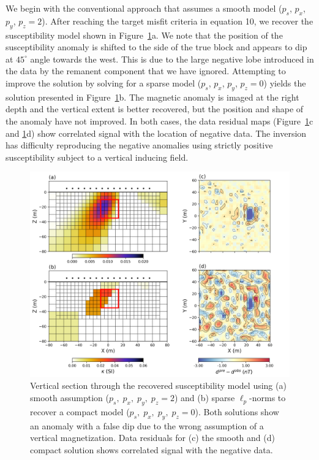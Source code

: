 \documentclass[paper]{geophysics}
\begin{document}
We begin with the conventional approach that assumes a smooth model ($p_s$, $p_x$, $p_y$, $p_z = 2$). After reaching the target misfit criteria in equation 10, we recover the susceptibility model shown in Figure~\ref{Susc_model}a. We note that the position of the susceptibility anomaly is shifted to the side of the true block and appears to dip at $45^\circ$ angle towards the west. This is due to the large negative lobe introduced in the data by the remanent component that we have ignored. Attempting to improve the solution by solving for a sparse model ($p_s$, $p_x$, $p_y$, $p_z = 0$) yields the solution presented in Figure~\ref{Susc_model}b. The magnetic anomaly is imaged at the right depth and the vertical extent is better recovered, but the position and shape of the anomaly have not improved. In both cases, the data residual maps (Figure~\ref{Susc_model}c and \ref{Susc_model}d) show correlated signal with the location of negative data. The inversion has difficulty reproducing the negative anomalies using strictly positive susceptibility subject to a vertical inducing field.

\begin{figure}[p!]
\includegraphics[width=\columnwidth]{Figures/Figure2.png}
\caption{Vertical section through the recovered susceptibility model using (a) smooth assumption ($p_s, \;p_x,\; p_y,\; p_z = 2$) and (b) sparse $\ell_p$-norms to recover a compact model ($p_s,\;p_x,\; p_y,\; p_z = 0$). Both solutions show an anomaly with a false dip due to the wrong assumption of a vertical magnetization. Data residuals for (c) the smooth and (d) compact solution shows correlated signal with the negative data.}
\label{Susc_model}
\end{figure}
\end{document}
